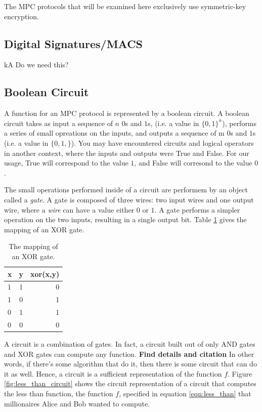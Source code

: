 \documentclass[12pt,twoside]{reedthesis}
\begin{document}
The MPC protocols that will be examined here exclusively use symmetric-key encryption.

\subsection{Digital Signatures/MACS}
kA
Do we need this?

\subsection{Boolean Circuit} 
A function for an MPC protocol is represented by a boolean circuit.
A boolean circuit takes as input a sequence of $n$ $0$s and $1$s, (i.e. a value in $\{0,1\}^n$), performs a series of small opreations on the inputs, and outputs a sequence of m $0$s and $1$s (i.e. a value in $\{0,1,\}$).
You may have encountered circuits and logical operators in another context, where the inputs and outputs were True and False.
For our usage, True will correspond to the value $1$, and False will corresond to the value $0$. 

The small operations performed inside of a circuit are performem by an object called a \emph{gate}.
A gate is composed of three wires: two input wires and one output wire, where a \emph{wire} can have a value either $0$ or $1$.
A gate performs a simpler operation on the two inputs, resulting in a single output bit.
Table \ref{tab:xor} gives the mapping of an XOR gate.

\begin{table}[h]
\label{tab:xor}
\centering
\begin{tabular}{ | l | c || r |}
\hline
x & y & xor(x,y) \\ \hline
1 & 1 & 0 \\ \hline
1 & 0 & 1 \\ \hline
0 & 1 & 1 \\ \hline
0 & 0 & 0 \\ \hline
\end{tabular}
\caption{The mapping of an XOR gate.}
\end{table}

A circuit is a combination of gates. 
In fact, a circuit built out of only AND gates and XOR gates can compute any function.
\textbf{Find details and citation} In other words, if there's some algorithm that do it, then there is some circuit that can do it as well.
Hence, a circuit is a sufficient representation of the function $f$.
Figure \ref{fig:less_than_circuit} shows the circuit representation of a circuit that computes the less than function, the function $f$, specified in equation \ref{eqn:less_than} that millionaires Alice and Bob wanted to compute.
\end{document}
